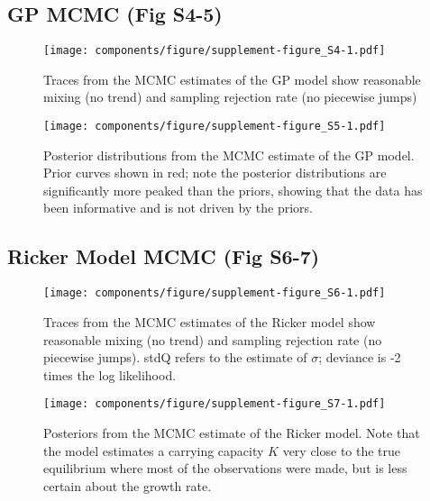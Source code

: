 \documentclass[]{components/elsarticle}
\begin{document}
\subsection{GP MCMC (Fig S4-5)}\label{gp-mcmc-fig-s4-5}

\begin{figure}[htbp]
\centering
\texttt{[image: components/figure/supplement-figure\_S4-1.pdf]}
\caption{Traces from the MCMC estimates of the GP model show reasonable
mixing (no trend) and sampling rejection rate (no piecewise jumps)}
\end{figure}

\begin{figure}[htbp]
\centering
\texttt{[image: components/figure/supplement-figure\_S5-1.pdf]}
\caption{Posterior distributions from the MCMC estimate of the GP model.
Prior curves shown in red; note the posterior distributions are
significantly more peaked than the priors, showing that the data has
been informative and is not driven by the priors.}
\end{figure}

\newpage
\newpage

\subsection{Ricker Model MCMC (Fig
S6-7)}\label{ricker-model-mcmc-fig-s6-7}

\begin{figure}[htbp]
\centering
\texttt{[image: components/figure/supplement-figure\_S6-1.pdf]}
\caption{Traces from the MCMC estimates of the Ricker model show
reasonable mixing (no trend) and sampling rejection rate (no piecewise
jumps). stdQ refers to the estimate of $\sigma$; deviance is -2 times
the log likelihood.}
\end{figure}

\begin{figure}[htbp]
\centering
\texttt{[image: components/figure/supplement-figure\_S7-1.pdf]}
\caption{Posteriors from the MCMC estimate of the Ricker model. Note
that the model estimates a carrying capacity $K$ very close to the true
equilibrium where most of the observations were made, but is less
certain about the growth rate.}
\end{figure}
\end{document}
